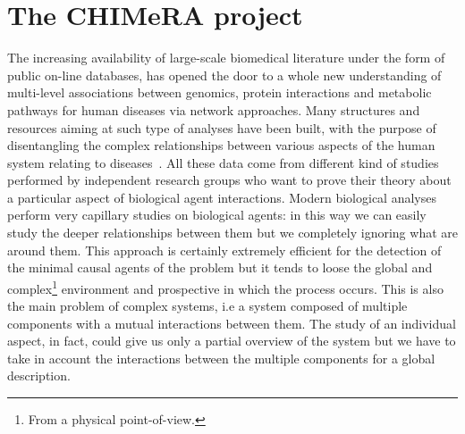 \documentclass{standalone}
\begin{document}
\section[CHIMeRA]{The CHIMeRA project}\label{chimera:chimera}

The increasing availability of large-scale biomedical literature under the form of public on-line databases, has opened the door to a whole new understanding of multi-level associations between genomics, protein interactions and metabolic pathways for human diseases via network approaches.
Many structures and resources aiming at such type of analyses have been built, with the purpose of disentangling the complex relationships between various aspects of the human system relating to diseases~\cite{SymtomsNet, HumanPhenotype, chimerDB2017}.
All these data come from different kind of studies performed by independent research groups who want to prove their theory about a particular aspect of biological agent interactions.
Modern biological analyses perform very capillary studies on biological agents: in this way we can easily study the deeper relationships between them but we completely ignoring what are around them.
This approach is certainly extremely efficient for the detection of the minimal causal agents of the problem but it tends to loose the global and complex\footnote{
  From a physical point-of-view.
} environment and prospective in which the process occurs.
This is also the main problem of complex systems, i.e a system composed of multiple components with a mutual interactions between them.
The study of an individual aspect, in fact, could give us only a partial overview of the system but we have to take in account the interactions between the multiple components for a global description.
\end{document}
